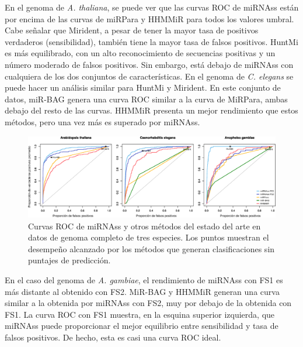 En el genoma de \textit{A. thaliana}, se puede ver que las curvas ROC de miRNAss están por encima de las curvas de miRPara y HHMMiR para todos los valores
umbral. Cabe señalar que Mirident, a pesar de tener la mayor tasa de positivos verdaderos (sensibilidad), también tiene la mayor tasa de falsos positivos.
HuntMi es más equilibrado, con un alto reconocimiento de secuencias positivas y un número moderado de falsos positivos. Sin embargo, está debajo de miRNAss
con cualquiera de los dos conjuntos de características.
En el genoma de \textit{C. elegans} se puede hacer un análisis similar para HuntMi y Mirident. En este conjunto de datos, miR-BAG genera una curva ROC
similar a la curva de MiRPara, ambas debajo del resto de las curvas. HHMMiR presenta un mejor rendimiento que estos métodos, pero una vez más es superado por
miRNAss.
\begin{figure}[tpb]
	\centering
	\includegraphics[width=\linewidth]{fig/genome-wide_ROC.eps}
	\caption[Curvas ROC en genoma completo]{Curvas ROC de miRNAss y otros métodos del estado del arte en datos de genoma completo de tres especies. Los puntos muestran el desempeño
		alcanzado por los métodos que generan clasificaciones sin puntajes de predicción.}
	\label{fig:ROC}
\end{figure}
En el caso del genoma de \textit{A. gambiae}, el rendimiento de miRNAss con FS1 es más distante al obtenido con FS2. MiR-BAG y HHMMiR generan una curva
similar a la obtenida por miRNAss con FS2, muy por debajo de la obtenida con FS1. La curva ROC con FS1 muestra, en la esquina superior izquierda, que miRNAss
puede proporcionar el mejor equilibrio entre sensibilidad y tasa de falsos positivos. De hecho, esta es casi una curva ROC ideal.


